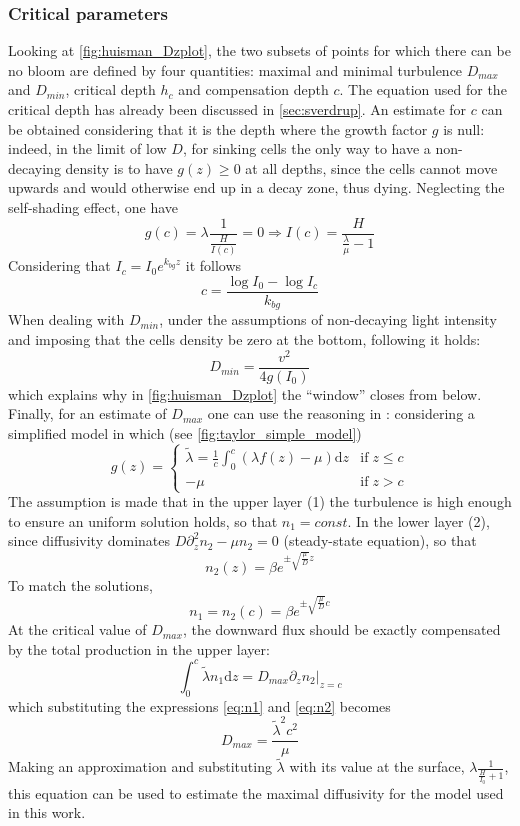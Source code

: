 \subsubsection{Critical parameters} \label{sec:huism_crit_parameters}
Looking at \autoref{fig:huisman_Dzplot}, the two subsets of points for which there can be no bloom are defined by four quantities: maximal and minimal turbulence $D_{max}$ and $D_{min}$, critical depth $h_c$ and compensation depth $c$. The equation used for the critical depth has already been discussed in \autoref{sec:sverdrup}. An estimate for $c$ can be obtained considering that it is the depth where the growth factor $g$ is null: indeed, in the limit of low $D$, for sinking cells the only way to have a non-decaying density is to have $g(z) \geq 0$ at all depths, since the cells cannot move upwards and would otherwise end up in a decay zone, thus dying. Neglecting the self-shading effect, one have
\[ g(c) = \lambda\frac{1}{\frac{H}{I(c)}} = 0 \Rightarrow
I(c) = \frac{H}{\frac{\lambda}{\mu} -1}\]
Considering that \( I_c = I_0 e^{k_{bg}z} \) it follows
\[ c = \frac{\log{I_0} - \log{I_c}}{k_{bg}} \]
When dealing with $D_{min}$, under the assumptions of non-decaying light intensity and imposing that the cells density be zero at the bottom, following \autocite{riley1949quantitative} it holds:
\[ D_{min} = \frac{v^2}{4g(I_0)} \]
which explains why in \autoref{fig:huisman_Dzplot} the ``window'' closes from below.
Finally, for an estimate of $D_{max}$ one can use the reasoning in \autocite{Taylor2011ShutdownBlooms}: considering a simplified model in which (see \autoref{fig:taylor_simple_model})
\[ g(z) = 
\begin{cases}
    \tilde{\lambda} = \frac{1}{c}\int_0^c (\lambda f(z) - \mu) \mathrm{d}z & \mathrm{if}\; z\leq c \\
    -\mu & \mathrm{if}\; z > c
\end{cases}
\]
The assumption is made that in the upper layer (1) the turbulence is high enough to ensure an uniform solution holds, so that $n_1 = const$. In the lower layer (2), since diffusivity dominates \( D\partial_z^2 n_2 - \mu n_2 = 0 \) (steady-state equation), so that
\begin{equation} \label{eq:n2}
 n_2(z) = \beta e^{\pm\sqrt{\frac{\mu}{D}} z} 
\end{equation}
To match the solutions, 
\begin{equation} \label{eq:n1}
 n_1 = n_2(c) = \beta e^{\pm\sqrt{\frac{\mu}{D}} c}
\end{equation}
At the critical value of $D_{max}$, the downward flux should be exactly compensated by the total production in the upper layer:
\[ \int_0^c \tilde{\lambda} n_1 \mathrm{d}z = D_{max} \partial_z n_2|_{z=c} \]
which substituting the expressions \autoref{eq:n1} and \autoref{eq:n2} becomes
\begin{equation} \label{eq:D_crit}
    D_{max} = \frac{\tilde{\lambda}^2c^2}{\mu}
\end{equation}
Making an approximation and substituting $\tilde{\lambda}$ with its value at the surface, \( \lambda \frac{1}{\frac{H}{I_0}+1} \), this equation can be used to estimate the maximal diffusivity for the model used in this work.


